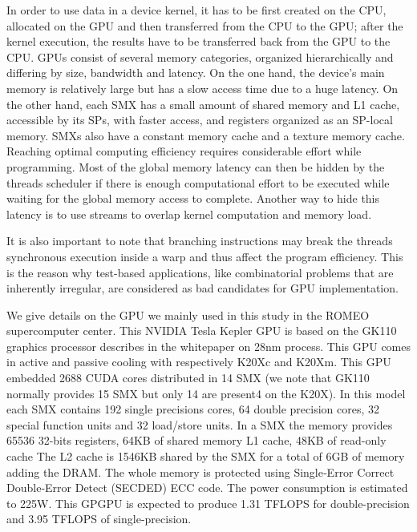 In order to use data in a device kernel, it has to be first created on the CPU, allocated on the GPU and then transferred from the CPU to the GPU; after the kernel execution, the results have to be transferred back from the GPU to the CPU. 
GPUs consist of several memory categories, organized hierarchically and differing by size, bandwidth and latency.   
On the one hand, the device's main memory is relatively large but has a slow access time due to a huge latency. 
On the other hand, each SMX has a small amount of shared memory and L1 cache, accessible by its SPs, with faster access, and registers organized as an SP-local memory. 
SMXs also have a constant memory cache and a texture memory cache.
Reaching optimal computing efficiency requires considerable effort while programming.
Most of the global memory latency can then be hidden by the threads scheduler if there is enough computational effort to be executed while waiting for the global memory access to complete. Another way to hide this latency is to use streams to overlap kernel computation and memory load. 

It is also important to note that branching instructions may break the threads synchronous execution inside a warp and thus affect the program efficiency. 
This is the reason why test-based applications, like combinatorial problems that are inherently irregular, are considered as bad candidates for GPU implementation. 

We give details on the GPU we mainly used in this study in the ROMEO supercomputer center. 
This NVIDIA Tesla Kepler GPU is based on the GK110 graphics processor describes in the whitepaper\cite{nvidia2012nvidias} on 28nm process.
This GPU comes in active and passive cooling with respectively K20Xc and K20Xm.
This GPU embedded 2688 CUDA cores distributed in 14 SMX (we note that GK110 normally provides 15 SMX but only 14 are present4 on the K20X).
In this model each SMX contains 192 single precisions cores, 64 double precision cores, 32 special function units and 32 load/store units.
In a SMX the memory provides 65536 32-bits registers, 64KB of shared memory L1 cache, 48KB of read-only cache
The L2 cache is 1546KB shared by the SMX for a total of 6GB of memory adding the DRAM.
The whole memory is protected using Single‐Error Correct Double‐Error Detect (SECDED) ECC code.
The power consumption is estimated to 225W.
This GPGPU is expected to produce 1.31 TFLOPS for double-precision and 3.95 TFLOPS of single-precision.

